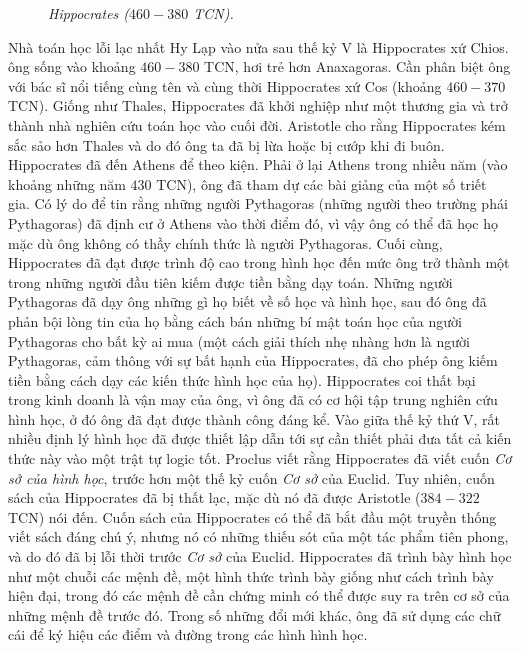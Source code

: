 \begin{multicols}{2}
\begin{figure}[H]
		\caption{\small\textit{\color{lichsutoanhoc}Hippocrates ($460-380$ TCN).}}
		\vspace*{-10pt}
	\end{figure}
	Nhà toán học lỗi lạc nhất Hy Lạp vào nửa sau thế kỷ V là Hippocrates xứ Chios. ông sống vào khoảng $460-380$ TCN,  hơi trẻ hơn Anaxagoras. Cần phân biệt ông  với bác sĩ nổi tiếng cùng tên và cùng thời Hippocrates xứ Cos (khoảng $460-370$ TCN). Giống như Thales, Hippocrates đã khởi nghiệp như một thương gia và trở thành nhà nghiên cứu toán học vào cuối đời. Aristotle cho rằng Hippocrates kém sắc sảo hơn Thales và do đó ông ta đã bị lừa hoặc bị cướp khi đi buôn. Hippocrates đã đến Athens để theo kiện. Phải ở lại Athens trong nhiều năm (vào khoảng những năm $430$ TCN), ông đã tham dự các bài giảng của một số triết gia. Có lý do để tin rằng những người Pythagoras (những người theo trường phái Pythagoras) đã định cư ở Athens vào thời điểm đó, vì vậy ông có thể đã học họ mặc dù ông không có thầy chính thức là người Pythagoras. Cuối cùng, Hippocrates đã đạt được trình độ cao trong hình học đến mức ông trở thành một trong những người đầu tiên kiếm được tiền bằng dạy toán. Những người Pythagoras đã dạy ông những gì họ biết về số học và hình học, sau đó ông đã phản bội lòng tin của họ bằng cách bán những bí mật toán học của người Pythagoras cho bất kỳ ai mua (một cách giải thích nhẹ nhàng hơn là người Pythagoras, cảm thông với sự bất hạnh của Hippocrates, đã cho phép ông kiếm tiền bằng cách dạy các kiến thức hình học của họ).
	\vskip 0.05cm
	Hippocrates coi thất bại trong kinh doanh là vận may của ông, vì ông đã có cơ hội tập trung nghiên cứu hình học, ở đó ông đã đạt được thành công đáng kể. 
	\vskip 0.05cm
	Vào giữa thế kỷ thứ V, rất nhiều định lý hình học đã được thiết lập dẫn tới sự cần thiết phải đưa tất cả kiến thức này vào một trật tự logic tốt. Proclus viết rằng Hippocrates đã viết cuốn  \textit{Cơ sở của hình học}, trước hơn một thế kỷ cuốn \textit{Cơ sở}  của Euclid. Tuy nhiên, cuốn sách của Hippocrates đã bị thất lạc, mặc dù nó đã được Aristotle ($384-322$ TCN) nói đến. Cuốn sách của Hippocrates có thể đã bắt đầu một truyền thống viết sách đáng chú ý, nhưng nó có những thiếu sót của một tác phẩm tiên phong, và do đó đã bị lỗi thời trước \textit{Cơ sở} của Euclid.
	\vskip 0.05cm
	Hippocrates đã trình bày hình học như một chuỗi các mệnh đề, một hình thức trình bày giống như cách trình bày hiện đại, trong đó các mệnh đề cần chứng minh có thể được suy ra trên cơ sở của những mệnh đề trước đó. Trong số những đổi mới khác, ông đã sử dụng các chữ cái để ký hiệu các điểm và đường trong các hình hình học.

\end{multicols}
